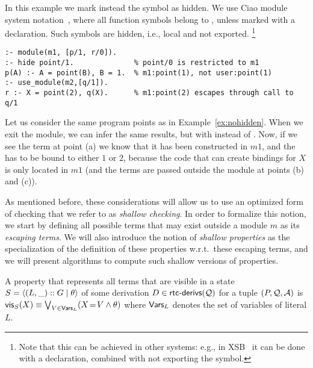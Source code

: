 \documentclass{llncs}
\newcommand{\finalcompression}[1]{\vspace*{#1}}
\begin{document}
\finalcompression{-2mm}
\begin{myexample}
  In this example we mark instead the  symbol as
  hidden. We use Ciao module system
  notation~\cite{ciao-modules-cl2000-short}, where all function
  symbols belong to , unless marked with a 
  declaration. Such symbols are hidden, i.e., local and not exported.%
%
  \footnote{Note that this can be achieved in other systems: e.g., in
    XSB~\cite{xsb-journal-2012} it can be done with a 
    declaration, combined with not exporting the symbol.
  }

\finalcompression{-3mm}
\begin{small}
\begin{verbatim}
:- module(m1, [p/1, r/0]).
:- hide point/1.              % point/0 is restricted to m1
p(A) :- A = point(B), B = 1.  % m1:point(1), not user:point(1)
:- use_module(m2,[q/1]).
r :- X = point(2), q(X).      % m1:point(2) escapes through call to q/1
\end{verbatim}
\end{small}
\finalcompression{-2mm}

Let us consider the same program points as in Example~\ref{ex:nohidden}.
%
When we exit the module, we can infer the same results, but with
 instead of .
%
Now, if we see the  term at point (a) we know that
it has been constructed in $m1$, and
%
the  has to be bound to either $1$ or $2$, because the code
that can create bindings for $X$ is only located in $m1$ (and the
 terms are passed outside the module at points (b) and
(c)).
%
\end{myexample}


As mentioned before, these considerations will allow us to use an
optimized form of checking that we refer to as \emph{shallow
  checking}. In order to formalize this notion,
we start by defining all possible
terms that may exist outside
a module $m$ as its \emph{escaping terms}. We will also introduce the
notion of \emph{shallow properties} as the specialization of the
definition of these properties w.r.t.\
these escaping terms, and we will present algorithms to compute such
shallow versions of properties.


\begin{definition}
  \label{def:vis-terms}
  A property that represents all terms that are visible in a state
  $S = \langle (L,\_)::G \mid{} \theta \rangle$ of some derivation
  $D \in \textsf{rtc-derivs}({\cal Q})$ for a tuple $(P,{\cal Q},{\cal A})$ is
  $\mathsf{vis}_{S}(X) \equiv \bigvee_{V \in \mathsf{Vars}_{L}} ( X\!=\!V \land \theta)$
  where $\mathsf{Vars}_{L}$ denotes the set of variables of literal $L$.
\end{definition}
\end{document}
